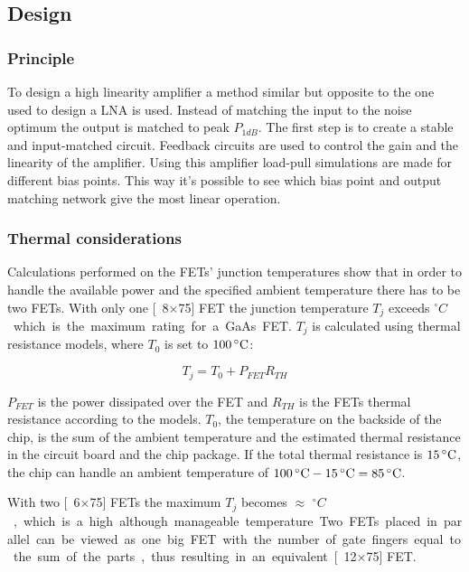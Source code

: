 		\subsection{Design}
			\subsubsection{Principle}
				To design a high linearity amplifier a method similar but opposite to the one used to design a LNA is used. Instead of matching the input to the noise optimum the output is matched to peak $P_{1dB}$. The first step is to create a stable and input-matched circuit. Feedback circuits are used to control the gain and the linearity of the amplifier. Using this amplifier load-pull simulations are made for different bias points. This way it's possible to see which bias point and output matching network give the most linear operation.\autocite{anand08}

			\subsubsection{Thermal considerations}
				Calculations performed on the FETs' junction temperatures show that in order to handle the available power and the specified ambient temperature there has to be two FETs. With only one \unit[8$\times$75]{\mum} FET the junction temperature $T_j$ exceeds \unit[170]{$^\circ C$} which is the maximum rating for a GaAs FET. $T_j$ is calculated using thermal resistance models\autocite{fukui80}, where $T_0$ is set to $\unit[100]{^\circ C}$:

				\begin{equation}
					T_j=T_0+P_{FET}R_{TH}
				\end{equation}

				$P_{FET}$ is the power dissipated over the FET and $R_{TH}$ is the FETs thermal resistance according to the models. $T_0$, the temperature on the backside of the chip, is the sum of the ambient temperature and the estimated thermal resistance in the circuit board and the chip package. If the total thermal resistance is $\unit[15]{^\circ C}$, the chip can handle an ambient temperature of $\unit[100]{^\circ C}-\unit[15]{^\circ C}=\unit[85]{^\circ C}$.

				With two \unit[6$\times$75]{\mum} FETs the maximum $T_j$ becomes $\approx$ \unit[150]{$^\circ C$}, which is a high although manageable temperature. Two FETs placed in parallel can be viewed as one big FET with the number of gate fingers equal to the sum of the parts, thus resulting in an equivalent \unit[12$\times$75]{\mum} FET.

